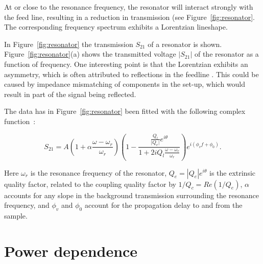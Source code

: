  At or close to the resonance frequency, the resonator will interact strongly with the feed line, resulting in a reduction in transmission (see Figure~\ref{fig:resonator}. The corresponding frequency spectrum exhibits a Lorentzian lineshape.

  In Figure~\ref{fig:resonator} the transmission $S_{21}$ of a resonator is shown. Figure~\ref{fig:resonator}(a) shows the transmitted voltage $|S_{21}|$ of the resonator as a function of frequency. One interesting point is that the Lorentzian exhibits an asymmetry, which is often attributed to reflections in the feedline \cite[p192]{Geerlings}. This could be caused by impedance mismatching of components in the set-up, which would result in part of the signal being reflected.

  The data has in Figure~\ref{fig:resonator} been fitted with the following complex function~\cite{bruno2015reducing}:

  \begin{equation}
    S_{21} =A \left( 1 + \alpha \frac{\omega-\omega_r}{\omega_r} \right)
    \left(1-\frac{\frac{Q_l}{\lvert Q_e \rvert}e^{i\theta}}{1+2iQ_l\frac{\omega-\omega_r}{\omega_r}}\right)e^{i\left(\phi_v f+\phi_0\right)}.
    \label{eq:THEhanger}
  \end{equation}

  Here $\omega_r$ is the resonance frequency of the resonator, $Q_e=\left|Q_e\right|e^{i\theta}$ is the extrinsic quality factor, related to the coupling quality factor by $1/Q_c=Re\left(1/Q_e\right)$, $\alpha$ accounts for any slope in the background transmission surrounding the resonance frequency, and $\phi_v$ and $\phi_0$ account for the propagation delay to and from the sample.

\section{Power dependence}
\label{sec:resonator:results:power_dependence}

